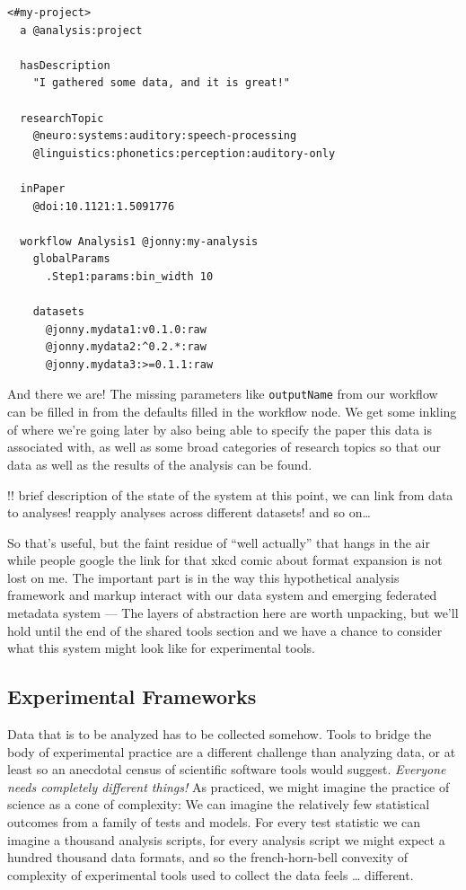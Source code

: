 \documentclass[10pt]{tufte-book}
\begin{document}
\begin{verbatim}
<#my-project>
  a @analysis:project

  hasDescription
    "I gathered some data, and it is great!"

  researchTopic
    @neuro:systems:auditory:speech-processing
    @linguistics:phonetics:perception:auditory-only

  inPaper
    @doi:10.1121:1.5091776 

  workflow Analysis1 @jonny:my-analysis
    globalParams
      .Step1:params:bin_width 10

    datasets
      @jonny.mydata1:v0.1.0:raw
      @jonny.mydata2:^0.2.*:raw
      @jonny.mydata3:>=0.1.1:raw
\end{verbatim}

And there we are! The missing parameters like \texttt{outputName} from
our workflow can be filled in from the defaults filled in the workflow
node. We get some inkling of where we're going later by also being able
to specify the paper this data is associated with, as well as some broad
categories of research topics so that our data as well as the results of
the analysis can be found.

!! brief description of the state of the system at this point, we can
link from data to analyses! reapply analyses across different datasets!
and so on\ldots{}

So that's useful, but the faint residue of ``well actually'' that hangs
in the air while people google the link for that xkcd comic about format
expansion is not lost on me. The important part is in the way this
hypothetical analysis framework and markup interact with our data system
and emerging federated metadata system --- The layers of abstraction
here are worth unpacking, but we'll hold until the end of the shared
tools section and we have a chance to consider what this system might
look like for experimental tools.






\subsection{Experimental Frameworks}



 Data that is to be analyzed has to be collected somehow.
Tools to bridge the body of experimental practice are a different
challenge than analyzing data, or at least so an anecdotal census of
scientific software tools would suggest. \emph{Everyone needs completely
different things!} As practiced, we might imagine the practice of
science as a cone of complexity: We can imagine the relatively few
statistical outcomes from a family of tests and models. For every test
statistic we can imagine a thousand analysis scripts, for every analysis
script we might expect a hundred thousand data formats, and so the
french-horn-bell convexity of complexity of experimental tools used to
collect the data feels \ldots{} different.
\end{document}
